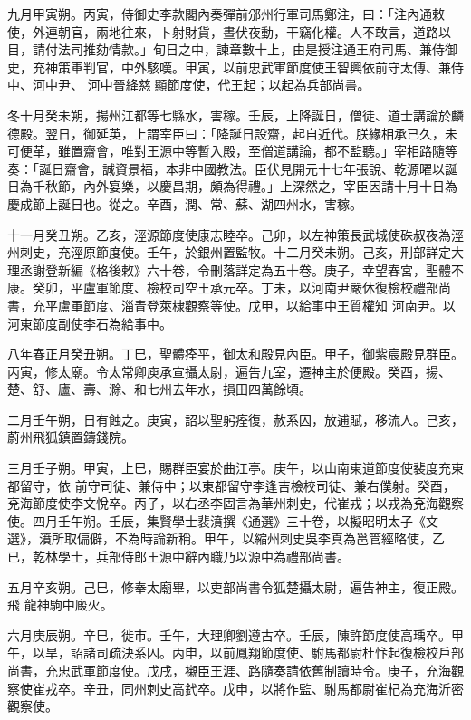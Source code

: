\begin{pinyinscope}
 九月甲寅朔。丙寅，侍御史李款閣內奏彈前邠州行軍司馬鄭注，曰：「注內通敕使，外連朝官，兩地往來，卜射財貨，晝伏夜動，干竊化權。人不敢言，道路以目，請付法司推劾情款。」旬日之中，諫章數十上，由是授注通王府司馬、兼侍御史，充神策軍判官，中外駭嘆。甲寅，以前忠武軍節度使王智興依前守太傅、兼侍中、河中尹、
 河中晉絳慈顯節度使，代王起；以起為兵部尚書。



 冬十月癸未朔，揚州江都等七縣水，害稼。壬辰，上降誕日，僧徒、道士講論於麟德殿。翌日，御延英，上謂宰臣曰：「降誕日設齋，起自近代。朕緣相承已久，未可便革，雖置齋會，唯對王源中等暫入殿，至僧道講論，都不監聽。」宰相路隨等奏：「誕日齋會，誠資景福，本非中國教法。臣伏見開元十七年張說、乾源曜以誕日為千秋節，內外宴樂，以慶昌期，頗為得禮。」上深然之，宰臣因請十月十日為
 慶成節上誕日也。從之。辛酉，潤、常、蘇、湖四州水，害稼。



 十一月癸丑朔。乙亥，涇源節度使康志睦卒。己卯，以左神策長武城使硃叔夜為涇州刺史，充涇原節度使。壬午，於銀州置監牧。十二月癸未朔。己亥，刑部詳定大理丞謝登新編《格後敕》六十卷，令刪落詳定為五十卷。庚子，幸望春宮，聖體不康。癸卯，平盧軍節度、檢校司空王承元卒。丁未，以河南尹嚴休復檢校禮部尚書，充平盧軍節度、淄青登萊棣觀察等使。戊甲，以給事中王質權知
 河南尹。以河東節度副使李石為給事中。



 八年春正月癸丑朔。丁巳，聖體痊平，御太和殿見內臣。甲子，御紫宸殿見群臣。丙寅，修太廟。令太常卿庾承宣攝太尉，遍告九室，遷神主於便殿。癸酉，揚、楚、舒、廬、壽、滁、和七州去年水，損田四萬餘頃。



 二月壬午朔，日有蝕之。庚寅，詔以聖躬痊復，赦系囚，放逋賦，移流人。己亥，蔚州飛狐鎮置鑄錢院。



 三月壬子朔。甲寅，上巳，賜群臣宴於曲江亭。庚午，以山南東道節度使裴度充東都留守，依
 前守司徒、兼侍中；以東都留守李逢吉檢校司徒、兼右僕射。癸酉，兗海節度使李文悅卒。丙子，以右丞李固言為華州刺史，代崔戎；以戎為兗海觀察使。四月壬午朔。壬辰，集賢學士裴濆撰《通選》三十卷，以擬昭明太子《文選》，濆所取偏僻，不為時論新稱。甲午，以縮州刺史吳李真為邕管經略使，乙已，乾林學士，兵部侍郎王源中辭內職乃以源中為禮部尚書。



 五月辛亥朔。己巳，修奉太廟畢，以吏部尚書令狐楚攝太尉，遍告神主，復正殿。飛
 龍神駒中廄火。



 六月庚辰朔。辛巳，徙市。壬午，大理卿劉遵古卒。壬辰，陳許節度使高瑀卒。甲午，以旱，詔諸司疏決系囚。丙申，以前鳳翔節度使、駙馬都尉杜忭起復檢校戶部尚書，充忠武軍節度使。戊戌，襯臣王涯、路隨奏請依舊制讀時令。庚子，充海觀察使崔戎卒。辛丑，同州刺史高釴卒。戊申，以將作監、駙馬都尉崔杞為充海沂密觀察使。




\end{pinyinscope}
